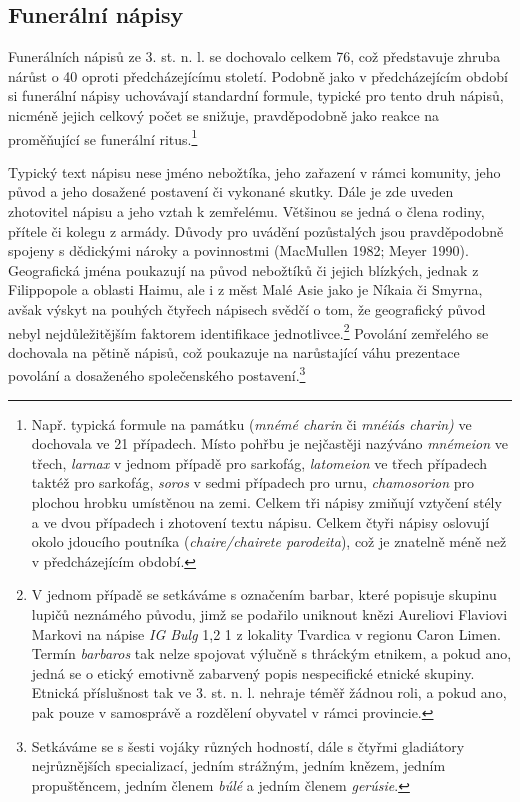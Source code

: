 
\subsection[funerální-nápisy-15]{Funerální nápisy}

Funerálních nápisů ze 3. st. n. l. se dochovalo celkem 76, což představuje zhruba nárůst o 40  oproti předcházejícímu století. Podobně jako v předcházejícím období si funerální nápisy uchovávají standardní formule, typické pro tento druh nápisů, nicméně jejich celkový počet se snižuje, pravděpodobně jako reakce na proměňující se funerální ritus.\footnote{Např. typická formule na památku ({\em mnémé charin} či {\em mnéiás charin)} ve dochovala ve 21 případech. Místo pohřbu je nejčastěji nazýváno {\em mnémeion} ve třech, {\em larnax} v jednom případě pro sarkofág, {\em latomeion} ve třech případech taktéž pro sarkofág, {\em soros} v sedmi případech pro urnu, {\em chamosorion} pro plochou hrobku umístěnou na zemi. Celkem tři nápisy zmiňují vztyčení stély a ve dvou případech i zhotovení textu nápisu. Celkem čtyři nápisy oslovují okolo jdoucího poutníka ({\em chaire/chairete parodeita}), což je znatelně méně než v předcházejícím období.}

Typický text nápisu nese jméno nebožtíka, jeho zařazení v rámci komunity, jeho původ a jeho dosažené postavení či vykonané skutky. Dále je zde uveden zhotovitel nápisu a jeho vztah k zemřelému. Většinou se jedná o člena rodiny, přítele či kolegu z armády. Důvody pro uvádění pozůstalých jsou pravděpodobně spojeny s dědickými nároky a povinnostmi (MacMullen 1982; Meyer 1990). Geografická jména poukazují na původ nebožtíků či jejich blízkých, jednak z Filippopole a oblasti Haimu, ale i z měst Malé Asie jako je Níkaia či Smyrna, avšak výskyt na pouhých čtyřech nápisech svědčí o tom, že geografický původ nebyl nejdůležitějším faktorem identifikace jednotlivce.\footnote{V jednom případě se setkáváme s označením barbar, které popisuje skupinu lupičů neznámého původu, jimž se podařilo uniknout knězi Aureliovi Flaviovi Markovi na nápise {\em IG Bulg} 1,2 1 z lokality Tvardica v regionu Caron Limen. Termín {\em barbaros} tak nelze spojovat výlučně s thráckým etnikem, a pokud ano, jedná se o etický emotivně zabarvený popis nespecifické etnické skupiny. Etnická příslušnost tak ve 3. st. n. l. nehraje téměř žádnou roli, a pokud ano, pak pouze v samosprávě a rozdělení obyvatel v rámci provincie.} Povolání zemřelého se dochovala na pětině nápisů, což poukazuje na narůstající váhu prezentace povolání a dosaženého společenského postavení.\footnote{Setkáváme se s šesti vojáky různých hodností, dále s čtyřmi gladiátory nejrůznějších specializací, jedním strážným, jedním knězem, jedním propuštěncem, jedním členem {\em búlé} a jedním členem {\em gerúsie}.}

